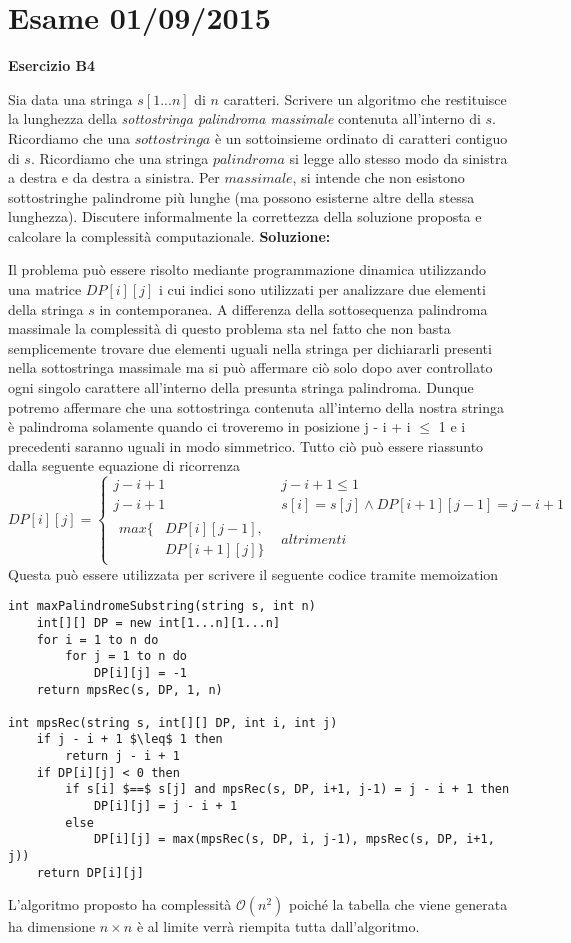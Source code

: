 \documentclass[../cheatSheetAlgoritmi.tex]{subfiles}
\begin{document}
\section{Esame 01/09/2015}
\textbf{Esercizio B4}

Sia data una stringa $s[1...n]$ di $n$ caratteri. Scrivere un algoritmo che restituisce la lunghezza della \emph{sottostringa palindroma massimale} contenuta all'interno di $s$. Ricordiamo che una $sottostringa$ è un sottoinsieme ordinato di caratteri contiguo di $s$. Ricordiamo che una stringa $palindroma$ si legge allo stesso modo da sinistra a destra e da destra a sinistra. Per $massimale$, si intende che non esistono sottostringhe palindrome più lunghe (ma possono esisterne altre della stessa lunghezza). Discutere informalmente la correttezza della soluzione proposta e calcolare la complessità computazionale.
\textbf{Soluzione:}

Il problema può essere risolto mediante programmazione dinamica utilizzando una matrice $DP[i][j]$ i cui indici sono utilizzati per analizzare due elementi della stringa $s$ in contemporanea. A differenza della sottosequenza palindroma massimale la complessità di questo problema sta nel fatto che non basta semplicemente trovare due elementi uguali nella stringa per dichiararli presenti nella sottostringa massimale ma si può affermare ciò solo dopo aver controllato ogni singolo carattere all'interno della presunta stringa palindroma. Dunque potremo affermare che una sottostringa contenuta all'interno della nostra stringa è palindroma solamente quando ci troveremo in posizione j - i + i $\leq$ 1 e i precedenti saranno uguali in modo simmetrico. Tutto ciò può essere riassunto dalla seguente equazione di ricorrenza
\begin{equation*}
  	DP[i][j]=\begin{cases}
  		j - i + 1 & \text{$j - i + 1 \leq 1$}\\
		  j - i + 1 & \text{$s[i] = s[j] \land DP[i+1][j-1] = j - i + 1$}\\
		\begin{aligned}
			max\{ &
			DP[i][j-1],\\ &
			DP[i+1][j]\}
		\end{aligned} & \text{$altrimenti$}
  	\end{cases}
\end{equation*}
Questa può essere utilizzata per scrivere il seguente codice tramite memoization
\begin{lstlisting}[caption=Sottostringa Palindroma Massimale]
int maxPalindromeSubstring(string s, int n)
	int[][] DP = new int[1...n][1...n]
	for i = 1 to n do
		for j = 1 to n do
			DP[i][j] = -1
	return mpsRec(s, DP, 1, n)
	
int mpsRec(string s, int[][] DP, int i, int j)
	if j - i + 1 $\leq$ 1 then
		return j - i + 1
	if DP[i][j] < 0 then
		if s[i] $==$ s[j] and mpsRec(s, DP, i+1, j-1) = j - i + 1 then
			DP[i][j] = j - i + 1
		else 
			DP[i][j] = max(mpsRec(s, DP, i, j-1), mpsRec(s, DP, i+1, j)) 
	return DP[i][j]
\end{lstlisting}
L'algoritmo proposto ha complessità $\mathcal{O}(n^{2})$ poiché la tabella che viene generata ha dimensione $n \times n$ è al limite verrà riempita tutta dall'algoritmo. 
 
\end{document}
